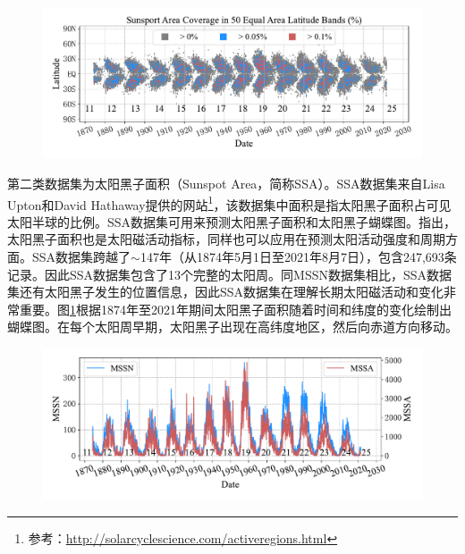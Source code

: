 \begin{figure}[!htbp]
  \vspace{-0.3cm}
  \centering
  \includegraphics[width=\textwidth]{Img/chap3_ss/ss_butterfly.pdf}
  \vspace{-1.4cm}
  \label{fig:ss_butterfly}
\end{figure}

第二类数据集为太阳黑子面积（Sunspot Area，简称SSA）。SSA数据集来自Lisa Upton和David Hathaway提供的网站\footnote{参考：\href{http://solarcyclescience.com/activeregions.html}{http://solarcyclescience.com/activeregions.html}}，该数据集中面积是指太阳黑子面积占可见太阳半球的比例。SSA数据集可用来预测太阳黑子面积和太阳黑子蝴蝶图。\citet{hathaway2015solar}指出，太阳黑子面积也是太阳磁活动指标，同样也可以应用在预测太阳活动强度和周期方面。SSA数据集跨越了$\sim$147年（从1874年5月1日至2021年8月7日），包含247,693条记录。因此SSA数据集包含了13个完整的太阳周。同MSSN数据集相比，SSA数据集还有太阳黑子发生的位置信息，因此SSA数据集在理解长期太阳磁活动和变化非常重要。图\ref{fig:ss_butterfly}根据1874年至2021年期间太阳黑子面积随着时间和纬度的变化绘制出蝴蝶图。在每个太阳周早期，太阳黑子出现在高纬度地区，然后向赤道方向移动。

\begin{figure}[!htbp]
  \vspace{-0.3cm}
  \centering
  \includegraphics[width=\textwidth]{Img/chap3_ss/ss_number_area.pdf}
  \vspace{-1.4cm}
  \label{fig:ss_number_area}
\end{figure}

